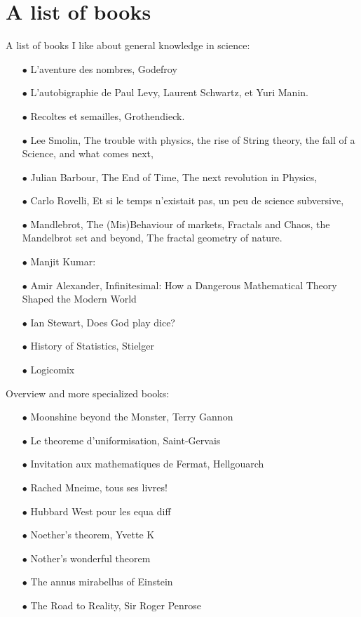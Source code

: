 
\section{A list of books}
  
A list of books I like about general knowledge in science:

\begin{itemize}
\item[$\bullet$] L'aventure des nombres, Godefroy
\item[$\bullet$] L'autobigraphie de Paul Levy, Laurent Schwartz, et Yuri Manin.
\item[$\bullet$] Recoltes et semailles, Grothendieck.
\item[$\bullet$] Lee Smolin, The trouble with physics, the rise of String theory, the fall of a Science, and what comes next,
\item[$\bullet$] Julian Barbour, The End of Time, The next revolution in Physics,
\item[$\bullet$] Carlo Rovelli, Et si le temps n'existait pas, un peu de science subversive,
\item[$\bullet$] Mandlebrot, The (Mis)Behaviour of markets, Fractals and Chaos, the Mandelbrot set and beyond, The fractal geometry of nature.
\item[$\bullet$] Manjit Kumar:
\item[$\bullet$] Amir Alexander, Infinitesimal: How a Dangerous Mathematical Theory Shaped the Modern World
\item[$\bullet$] Ian Stewart, Does God play dice?
\item[$\bullet$] History of Statistics, Stielger
\item[$\bullet$] Logicomix\\
\end{itemize}

Overview and more specialized books:
\begin{itemize}
\item[$\bullet$] Moonshine beyond the Monster, Terry Gannon
\item[$\bullet$] Le theoreme d'uniformisation, Saint-Gervais
\item[$\bullet$] Invitation aux mathematiques de Fermat, Hellgouarch
\item[$\bullet$] Rached Mneime, tous ses livres!
\item[$\bullet$] Hubbard West pour les equa diff
\item[$\bullet$] Noether's theorem, Yvette K
\item[$\bullet$] Nother's wonderful theorem
\item[$\bullet$] The annus mirabellus of Einstein
\item[$\bullet$] The Road to Reality, Sir Roger Penrose \\
\end{itemize}

